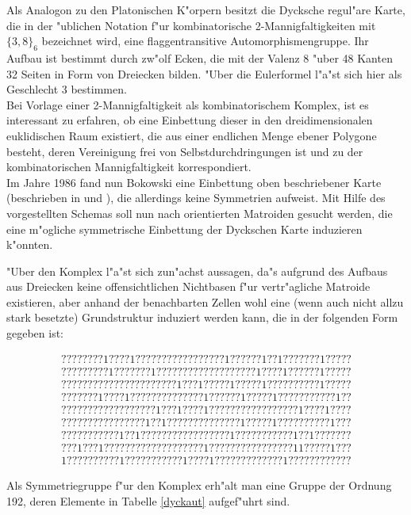 Als Analogon zu den Platonischen K"orpern besitzt die Dycksche regul"are Karte,
die in der "ublichen Notation f"ur kombinatorische 2-Mannigfaltigkeiten mit
$\{3,8\}_6$ bezeichnet wird, eine flaggentransitive Automorphismengruppe.
Ihr Aufbau ist bestimmt durch zw"olf Ecken, die mit der Valenz 8 "uber 48 Kanten
32 Seiten in Form von Dreiecken bilden. "Uber die Eulerformel l"a"st sich hier
als Geschlecht 3 bestimmen.\\
Bei Vorlage einer 2-Mannigfaltigkeit als kombinatorischem Komplex, ist es
interessant zu erfahren, ob eine Einbettung dieser in den dreidimensionalen
euklidischen Raum existiert, die aus einer endlichen Menge ebener Polygone
besteht, deren Vereinigung frei von Selbstdurchdringungen ist und zu der
kombinatorischen Mannigfaltigkeit korrespondiert.\\
Im Jahre 1986 fand nun Bokowski eine Einbettung oben beschriebener
Karte (beschrieben in \cite{Bo:86} und \cite{HoWi:91}), die allerdings keine
Symmetrien aufweist. Mit Hilfe des vorgestellten Schemas soll nun nach
orientierten Matroiden gesucht werden, die eine m"ogliche symmetrische
Einbettung der Dyckschen Karte induzieren k"onnten.

"Uber den Komplex l"a"st sich zun"achst aussagen, da"s aufgrund des Aufbaus
aus Dreiecken keine offensichtlichen Nichtbasen f"ur vertr"agliche Matroide
existieren, aber anhand der benachbarten Zellen wohl eine (wenn auch nicht
allzu stark besetzte) Grundstruktur induziert werden kann, die in der
folgenden Form gegeben ist:

{\tt $$
\begin{array}{c}
????????1????1?????????????????1??????1??1???????1?????\\
?????????1???????1???????????????????1????1??????1?????\\
??????????????????????1???1?????1?????1??????????1?????\\
???????1????1??????????????1??????1?????1???????????1??\\
??????????????????1???1????1?????????????????1????1????\\
????????????????1??1??????????????1?????1??????????1???\\
???????????1??1?????????????????1???????????1??1???????\\
???1???1???????????????????1????????????????11?????1???\\
1??????????1???????????1????1?????????????1????????????
\end{array}
$$}

Als Symmetriegruppe f"ur den Komplex erh"alt man eine Gruppe der Ordnung 192,
deren Elemente in Tabelle \ref{dyckaut} aufgef"uhrt sind.


